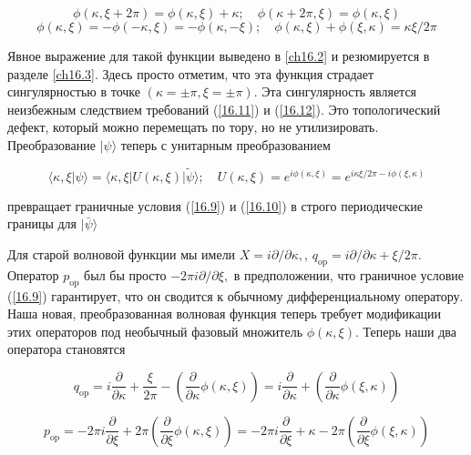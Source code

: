 \documentclass[main.tex]{subfiles}
\begin{document}
\begin{equation}\label{16.11}
\phi(\kappa, \xi+2 \pi)=\phi(\kappa, \xi)+\kappa ; \quad \phi(\kappa+2 \pi, \xi)=\phi(\kappa, \xi)
\end{equation}
\begin{equation}\label{16.12}
\phi(\kappa, \xi)=-\phi(-\kappa, \xi)=-\phi(\kappa,-\xi) ; \quad \phi(\kappa, \xi)+\phi(\xi, \kappa)=\kappa \xi / 2 \pi
\end{equation}


Явное выражение для такой функции выведено в \ref{ch16.2} и резюмируется в разделе \ref{ch16.3}. Здесь просто отметим, что эта функция страдает сингулярностью в точке $(\kappa=\pm \pi, \xi=\pm \pi)$. Эта сингулярность является неизбежным следствием требований (\ref{16.11}) и (\ref{16.12}). Это топологический дефект, который можно перемещать по тору, но не утилизировать. Преобразование $|\psi\rangle$ теперь с унитарным преобразованием

\begin{equation}\label{16.13}
\langle\kappa, \xi | \psi\rangle=\langle\kappa, \xi|U(\kappa, \xi)| \tilde{\psi}\rangle ; \quad U(\kappa, \xi)=e^{i \phi(\kappa, \xi)}=e^{i \kappa \xi / 2 \pi-i \phi(\xi, \kappa)}
\end{equation}

превращает граничные условия (\ref{16.9}) и (\ref{16.10}) в строго периодические границы для $|\bar{\psi}\rangle$

Для старой волновой функции мы имели $X=i \partial / \partial \kappa,$, $q_{\mathrm{op}}=i \partial / \partial \kappa+\xi / 2 \pi$. Оператор $p_{\mathrm{op}}$ был бы просто $-2 \pi i \partial / \partial \xi,$ в предположении, что граничное условие (\ref{16.9}) гарантирует, что он сводится к обычному дифференциальному оператору. Наша новая, преобразованная волновая функция теперь требует модификации этих операторов под необычный фазовый множитель $\phi(\kappa, \xi)$. Теперь наши два оператора становятся

\begin{equation}\label{16.14}
q_{\mathrm{op}}=i \frac{\partial}{\partial \kappa}+\frac{\xi}{2 \pi}-\left(\frac{\partial}{\partial \kappa} \phi(\kappa, \xi)\right)=i \frac{\partial}{\partial \kappa}+\left(\frac{\partial}{\partial \kappa} \phi(\xi, \kappa)\right)
\end{equation}

\begin{equation}\label{16.15}
p_{\mathrm{op}}=-2 \pi i \frac{\partial}{\partial \xi}+2 \pi\left(\frac{\partial}{\partial \xi} \phi(\kappa, \xi)\right)=-2 \pi i \frac{\partial}{\partial \xi}+\kappa-2 \pi\left(\frac{\partial}{\partial \xi} \phi(\xi, \kappa)\right)
\end{equation}
\end{document}
